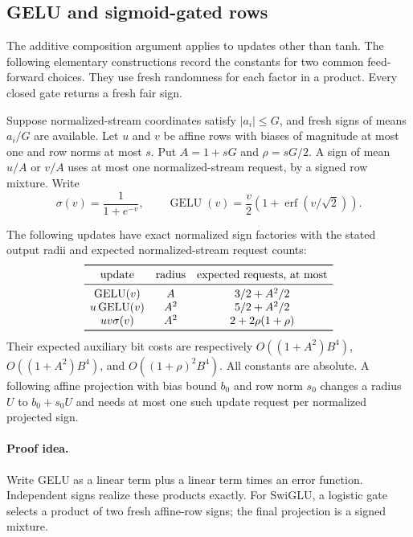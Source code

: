 \subsection{GELU and sigmoid-gated rows}
\label{sec:practical-feedforward}

The additive composition argument applies to updates other than tanh.
The following elementary constructions record the constants for two
common feed-forward choices. They use fresh randomness for each factor
in a product. Every closed gate returns a fresh fair sign.

Suppose normalized-stream coordinates satisfy $|a_i|\le G$, and fresh
signs of means $a_i/G$ are available. Let $u$ and $v$ be affine rows
with biases of magnitude at most one and row norms at most $s$.
Put $A=1+sG$ and $\rho=sG/2$. A sign of mean $u/A$ or $v/A$ uses
at most one normalized-stream request, by a signed row mixture.
Write
\[
 \sigma(v)=\frac1{1+e^{-v}},\qquad
 \operatorname{GELU}(v)=\frac v2
       \left(1+\operatorname{erf}(v/\sqrt2)\right).
\]

\begin{lemma}
\label{lem:gelu-swiglu}
The following updates have exact normalized sign factories with the
stated output radii and expected normalized-stream request counts:
\[
\begin{array}{ccc}
 \toprule
 \textup{update}&\textup{radius}&\textup{expected requests, at most}\\ \midrule
 \operatorname{GELU}(v)&A&3/2+A^2/2\\
 u\operatorname{GELU}(v)&A^2&5/2+A^2/2\\
 uv\sigma(v)&A^2&2+2\rho(1+\rho)\\
 \bottomrule
\end{array}
\]
Their expected auxiliary bit costs are respectively
$O((1+A^2)B^4)$, $O((1+A^2)B^4)$, and
$O((1+\rho)^2B^4)$. All constants are absolute. A following affine
projection with bias bound $b_0$ and row norm $s_0$ changes a radius
$U$ to $b_0+s_0U$ and needs at most one such update request per
normalized projected sign.
\end{lemma}
\paragraph{Proof idea.}
Write GELU as a linear term plus a linear term times an error
function. Independent signs realize these products exactly. For SwiGLU,
a logistic gate selects a product of two fresh affine-row signs; the final
projection is a signed mixture.

